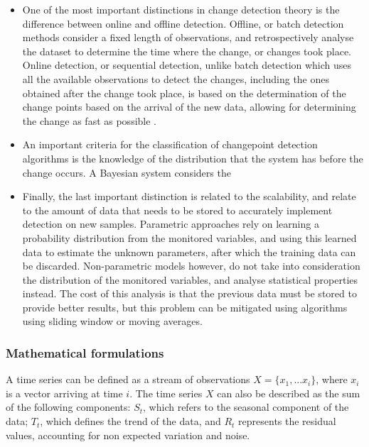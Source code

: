 \begin {itemize}
    \item One of the most important distinctions in change detection theory is the difference between online and offline detection. Offline, or batch detection methods consider a fixed length of observations, and retrospectively 
analyse the dataset to determine the time where the change, or changes took place. Online detection, or sequential detection, unlike batch detection which uses all the available observations to detect the changes, including the
ones obtained after the change took place, is based on the determination of the change points based on the arrival of the new data, allowing for determining the change as fast as possible \cite{ahmed_novel_2008}. 
    \item An important criteria for the classification of changepoint detection algorithms is the knowledge of the distribution that the system has before the change occurs. A Bayesian system considers the 
    \item Finally, the last important distinction is related to the scalability, and relate to the amount of data that needs to be stored to accurately implement detection on new samples. Parametric approaches rely on learning a 
probability distribution from the monitored variables, and using this learned data to estimate the unknown parameters, after which the training data can be discarded. Non-parametric models however, do not take into consideration the
distribution of the monitored variables, and analyse statistical properties instead. The cost of this analysis is that the previous data must be stored to provide better results, but this problem can be mitigated using 
algorithms using sliding window or moving averages.
\end {itemize}

\subsubsection {Mathematical formulations}

A time series can be defined as a stream of observations $X = \{x_1, ... x_i\}$, where $x_i$ is a vector arriving at time $i$. The time series $X$ can also be described as the sum of the following components: $S_t$,
which refers to the seasonal component of the data; $T_t$, which defines the trend of the data, and $R_t$ represents the residual values, accounting for non expected variation and noise.

